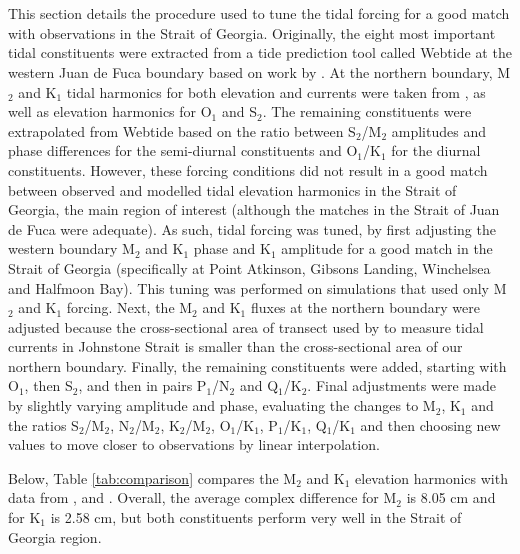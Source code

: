 \documentclass{tATO2e}
\begin{document}
\appendices
\section{}\label{sec:appendix}
This section details the procedure used to tune the tidal forcing for a good match with observations in the Strait of Georgia. Originally, the eight most important tidal constituents were extracted from a tide prediction tool called Webtide \citep{webtide} at the western Juan de Fuca boundary based on work by \citet{foreman2000webtide}. At the northern boundary,  M$_2$ and K$_1$ tidal harmonics for both elevation and currents were taken from \citet{thomson1980johnstone}, as well as elevation harmonics for O$_1$ and S$_2$. The remaining constituents were extrapolated from Webtide based on the ratio between S$_2$/M$_2$ amplitudes and phase differences for the semi-diurnal constituents and O$_1$/K$_1$ for the diurnal constituents. However, these forcing conditions did not result in a good match between observed and modelled tidal elevation harmonics in the Strait of Georgia, the main region of interest (although the matches in the Strait of Juan de Fuca were adequate). As such, tidal forcing was tuned, by first adjusting the western boundary M$_2$ and K$_1$ phase and K$_1$ amplitude for a good match in the Strait of Georgia (specifically at Point Atkinson, Gibsons Landing, Winchelsea and Halfmoon Bay). This tuning was performed on simulations that used only M$_2$ and K$_1$ forcing. Next, the M$_2$ and K$_1$ fluxes at the northern boundary were adjusted because the cross-sectional area of transect used by \citet{thomson1980johnstone} to measure tidal currents in Johnstone Strait is smaller than the cross-sectional area of our northern boundary. Finally, the remaining constituents were added, starting with O$_1$, then S$_2$, and then in pairs P$_1$/N$_2$ and Q$_1$/K$_2$. Final adjustments were made by slightly varying amplitude and phase, evaluating the changes to M$_2$, K$_1$ and the ratios S$_2$/M$_2$, N$_2$/M$_2$, K$_2$/M$_2$, O$_1$/K$_1$, P$_1$/K$_1$, Q$_1$/K$_1$ and then choosing new values to move closer to observations by linear interpolation. 

Below, Table \ref{tab:comparison} compares the M$_2$ and K$_1$ elevation harmonics with data from \citet{foreman1995tidal}, \citet{foreman2004m} and \citet{foreman2012circulation}. Overall, the average complex difference for M$_2$ is 8.05 cm and for K$_1$ is 2.58 cm, but both constituents perform very well in the Strait of Georgia region. 
\end{document}

